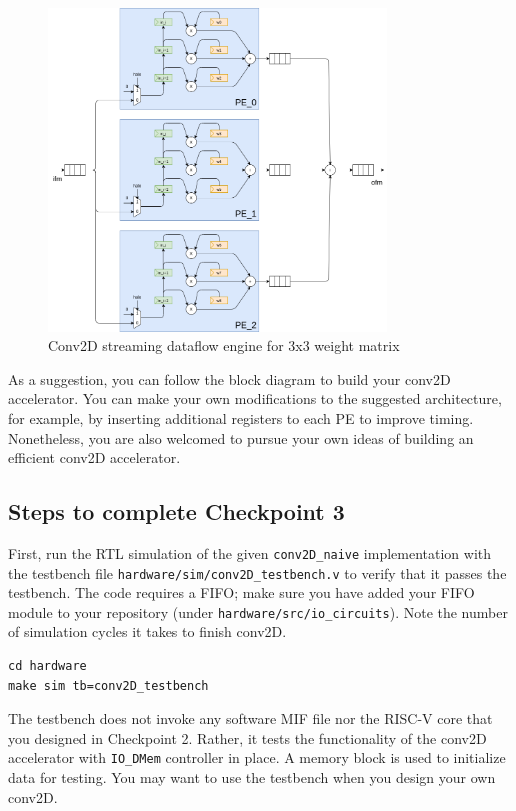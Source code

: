 \documentclass[11pt]{article}
\begin{document}
\begin{figure}[hbt]
\begin{center}
  \includegraphics[width=0.8\textwidth]{conv2D_stream.png}
  \caption{Conv2D streaming dataflow engine for 3x3 weight matrix}
  \label{fig:conv2D_stream}
\end{center}
\end{figure}

As a suggestion, you can follow the block diagram to build your conv2D accelerator. You can make your own modifications to the suggested architecture, for example, by inserting additional registers to each PE to improve timing. Nonetheless, you are also welcomed to pursue your own ideas of building an efficient conv2D accelerator.

\subsection{Steps to complete Checkpoint 3}

First, run the RTL simulation of the given \texttt{conv2D\_naive} implementation with the testbench file \verb|hardware/sim/conv2D_testbench.v| to verify that it passes the testbench. The code requires a FIFO; make sure you have added your FIFO module to your repository (under \verb|hardware/src/io_circuits|). Note the number of simulation cycles it takes to finish conv2D.

\begin{verbatim}
cd hardware
make sim tb=conv2D_testbench
\end{verbatim}

The testbench does not invoke any software MIF file nor the RISC-V core that you designed in Checkpoint 2. Rather, it tests the functionality of the conv2D accelerator with \texttt{IO\_DMem} controller in place. A memory block is used to initialize data for testing. You may want to use the testbench when you design your own conv2D.
\end{document}
